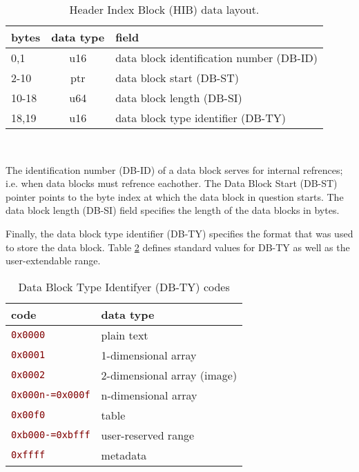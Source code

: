 \documentclass[pagesize=a4]{tufte-book}
\newcommand{\hlred}[1]{\textcolor{Maroon}{#1}}%
\newcommand{\hex}[1]{\hlred{\texttt{#1}}}%
\begin{document}
\begin{table}[ht]
	\centering
	\selectfont
	\begin{tabular}{lcl}
		\toprule
		bytes & data type & field\\
		\midrule
		0,1 & u16 & data block identification number (DB-ID)\\
		2-10 & ptr & data block start (DB-ST)\\
		10-18 & u64 & data block length (DB-SI)\\
		18,19 & u16 & data block type identifier (DB-TY)\\
		\bottomrule
	\end{tabular}
	~\label{tab:hib_fields}
	\caption{Header Index Block (HIB) data layout.}	
\end{table}
\vspace{5mm}

The identification number (DB-ID) of a data block serves for internal refrences; i.e. when data blocks must refrence eachother. The Data Block Start (DB-ST) pointer points to the byte index at which the data block in question starts. The data block length (DB-SI) field specifies the length of the data blocks in bytes.

Finally, the data block type identifier (DB-TY) specifies the format that was
used to store the data block. Table \ref{tab:data_block_type_codes} defines standard values for DB-TY as well as the user-extendable range.

\begin{table}[ht]
	\centering
	\selectfont
	\begin{tabular}{ll}
		\toprule
		code & data type\\
		\midrule
		\hex{0x0000} & plain text\\
		\hex{0x0001} & 1-dimensional array\\
		\hex{0x0002} & 2-dimensional array (image)\\
		\hex{0x000n-=0x000f} & n-dimensional array\\
		\hex{0x00f0} & table\\
		\hex{0xb000-=0xbfff} & user-reserved range\\
		\hex{0xffff} & metadata\\
		\bottomrule
	\end{tabular}
	~\label{tab:data_block_type_codes}
	\caption{Data Block Type Identifyer (DB-TY) codes}
\end{table}
\vspace{5mm}
\end{document}

